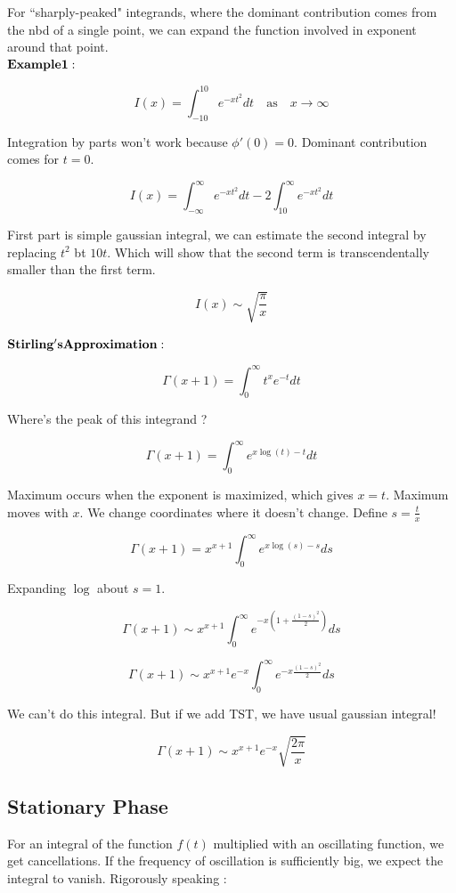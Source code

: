 \documentclass{report}
\begin{document}
For ``sharply-peaked" integrands, where the dominant contribution comes from the nbd of a single point, we can expand the function involved in exponent around that point.\\

\noindent $\bold{Example 1 :}$

$$ I(x) = \int_{-10}^{10}e^{-xt^2}dt \quad\mathrm{as}\quad x\to\infty$$

\noindent Integration by parts won't work because $\phi'(0) = 0$. Dominant contribution comes for $t=0$. 

$$I(x) = \int_{-\infty}^{\infty}e^{-xt^2}dt - 2\int_{10}^{\infty}e^{-xt^2}dt$$

\noindent First part is simple gaussian integral, we can estimate the second integral by replacing $t^2$ bt $10t$. Which will show that the second term is transcendentally smaller than the first term.

$$I(x) \sim \sqrt{\frac{\pi}{x}}$$

\noindent $\bold{Stirling's Approximation :}$

$$\Gamma(x+1) = \int_{0}^{\infty}t^x e^{-t}dt$$

\noindent Where's the peak of this integrand ? 

$$ \Gamma(x+1) = \int_{0}^{\infty}e^{x\log(t)-t}dt$$

\noindent Maximum occurs when the exponent is maximized, which gives $x = t$. Maximum moves with $x$. We change coordinates where it doesn't change. Define $ s = \frac{t}{x}$

$$\Gamma(x+1) = x^{x+1}\int_{0}^{\infty}e^{x\log(s) - s}ds$$

\noindent Expanding $\log$ about $s=1$.

$$\Gamma(x+1) \sim x^{x+1}\int_{0}^{\infty}e^{-x\left(1+\frac{(1-s)^2}{2}\right)}ds$$

$$\Gamma(x+1) \sim x^{x+1}e^{-x}\int_{0}^{\infty}e^{-x\frac{(1-s)^2}{2}}ds$$

\noindent We can't do this integral. But if we add TST, we have usual gaussian integral!

$$\Gamma(x+1) \sim x^{x+1}e^{-x} \sqrt{\frac{2\pi}{x}}$$

\subsection{Stationary Phase}

For an integral of the function $f(t)$ multiplied with an oscillating function, we get cancellations. If the frequency of oscillation is sufficiently big, we expect the integral to vanish. Rigorously speaking :
\end{document}
